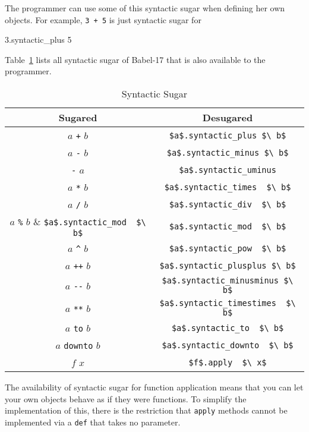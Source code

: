 \documentclass[11pt]{amsart}
\newcommand{\babelsrc}[1] {\lstinline!#1!}
\begin{document}
The programmer can use some of this syntactic sugar when defining her own objects. For example, \texttt{3 + 5} is just syntactic sugar for 
\begin{babellisting}
3.syntactic_plus 5
\end{babellisting} 
Table~\ref{tab:syntacticsugar} lists all syntactic sugar of Babel-17 that is also available to the programmer. 
\begin{table}
\caption{Syntactic Sugar}
\begin{tabular}{c|c}
\textbf{Sugared} & \textbf{Desugared} \\\hline\hline
$a$ \verb!+! $b$ & \babelsrc{$a$.syntactic_plus $\ b$} \\\hline
$a$ \verb!-! $b$ & \babelsrc{$a$.syntactic_minus $\ b$} \\\hline
\verb!-! $a$ & \babelsrc{$a$.syntactic_uminus} \\\hline
$a$ \verb!*! $b$ & \babelsrc{$a$.syntactic_times  $\ b$} \\\hline
$a$ \verb!/! $b$ & \babelsrc{$a$.syntactic_div  $\ b$} \\\hline
$a$ \verb!%! $b$ & \babelsrc{$a$.syntactic_mod  $\ b$} \\\hline
$a$ \verb+^+ $b$ & \babelsrc{$a$.syntactic_pow  $\ b$} \\\hline
$a$ \verb!++! $b$ & \babelsrc{$a$.syntactic_plusplus $\ b$} \\\hline
$a$ \verb!--! $b$ & \babelsrc{$a$.syntactic_minusminus $\ b$} \\\hline
$a$ \verb!**! $b$ & \babelsrc{$a$.syntactic_timestimes  $\ b$}\\\hline
$a$ \verb!to! $b$ & \babelsrc{$a$.syntactic_to  $\ b$}\\\hline
$a$ \verb!downto! $b$ & \babelsrc{$a$.syntactic_downto  $\ b$}\\\hline
$f$ $x$ &  \babelsrc{$f$.apply  $\ x$}
\end{tabular}
\label{tab:syntacticsugar}
\end{table}
The availability of syntactic sugar for function application means that you can let your own objects behave as if they were functions. To simplify the implementation of this, there is the restriction that \babelsrc{apply} methods cannot be implemented via a \babelsrc{def} that takes no parameter.
\end{document}

